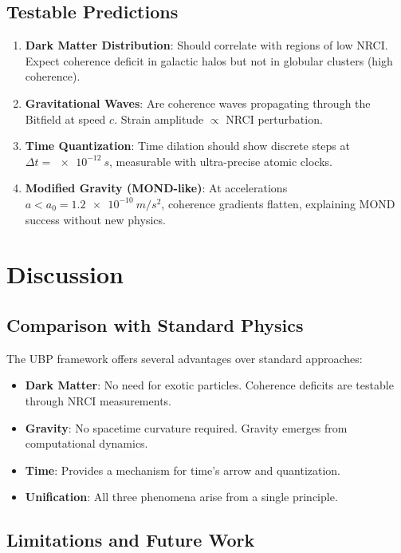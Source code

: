 \documentclass[12pt,a4paper]{article}
\begin{document}
\subsection{Testable Predictions}

\begin{enumerate}
\item \textbf{Dark Matter Distribution}: Should correlate with regions of low NRCI. Expect coherence deficit in galactic halos but not in globular clusters (high coherence).

\item \textbf{Gravitational Waves}: Are coherence waves propagating through the Bitfield at speed $c$. Strain amplitude $\propto$ NRCI perturbation.

\item \textbf{Time Quantization}: Time dilation should show discrete steps at $\Delta t = \SI{e-12}{s}$, measurable with ultra-precise atomic clocks.

\item \textbf{Modified Gravity (MOND-like)}: At accelerations $a < a_0 = \SI{1.2e-10}{m/s^2}$, coherence gradients flatten, explaining MOND success without new physics.
\end{enumerate}

\section{Discussion}

\subsection{Comparison with Standard Physics}

The UBP framework offers several advantages over standard approaches:

\begin{itemize}
\item \textbf{Dark Matter}: No need for exotic particles. Coherence deficits are testable through NRCI measurements.
\item \textbf{Gravity}: No spacetime curvature required. Gravity emerges from computational dynamics.
\item \textbf{Time}: Provides a mechanism for time's arrow and quantization.
\item \textbf{Unification}: All three phenomena arise from a single principle.
\end{itemize}

\subsection{Limitations and Future Work}
\end{document}
